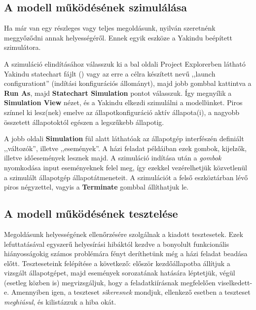 \begin{comment}
A \emph{default} ablakrészben tudjuk megadni az interface-eket, illetve a modellezéshez szükséges alapokat. A jobb oldali eszköztárral tudunk hozzáadni az ábrához újabb állapotokat, illetve onnan érünk el mindent, ami a modellezéshez szükséges.
\end{comment}


\subsection{A modell működésének szimulálása}
Ha már van egy részleges vagy teljes megoldásunk, nyilván szeretnénk meggyőződni annak helyességéről. Ennek egyik eszköze a Yakindu beépített szimulátora.

A szimuláció elindításához válasszuk ki a bal oldali Project Explorerben látható Yakindu statechart fájlt () vagy az erre a célra készített  nevű ,,launch configurationt'' (indítási konfigurációs állományt), majd jobb gombbal kattintva a \textbf{Run As}, majd \textbf{Statechart Simulation} pontot válasszuk. Így megnyílik a \textbf{Simulation View} nézet, és a Yakindu elkezdi szimulálni a modellünket. Piros színnel ki lesz(nek) emelve az állapotkonfiguráció aktív állapota(i), a nagyobb összetett állapotoktól egészen a legszűkebb állapotig.

A jobb oldali \textbf{Simulation} fül alatt láthatóak az állapotgép interfészén definiált ,,változók'', illetve ,,események''. A házi feladat példáiban ezek gombok, kijelzők, illetve időesemények lesznek majd. A szimuláció indítása után a \emph{gombok} nyomkodása input eseményeknek felel meg, így ezekkel vezérelhetjük közvetlenül a szimulált állapotgép állapotátmeneteit. A szimulációt a felső eszköztárban lévő piros négyzettel, vagyis a \textbf{Terminate} gombbal állíthatjuk le.


\subsection{A modell működésének tesztelése}

Megoldásunk helyességének ellenőrzésére szolgálnak a kiadott tesztesetek. Ezek lefuttatásával egyszerű helyesírási hibáktól kezdve a bonyolult funkcionális hiányosságokig számos problémára fényt deríthetünk még a házi feladat beadása előtt. Teszteseteink felépítése a következő: először kezdőállapotba állítjuk a vizsgált állapotgépet, majd események sorozatának hatására léptetjük, végül (esetleg közben is) megvizsgáljuk, hogy a feladatkiírásnak megfelelően viselkedett-e. Amennyiben igen, a teszteset \emph{sikeresnek} mondjuk, ellenkező esetben a teszteset \emph{meghiúsul}, és kilistázzuk a hiba okát.


